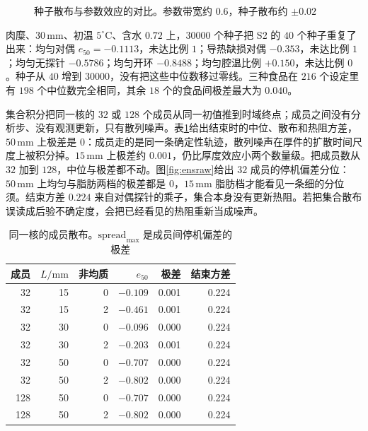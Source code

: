 \begin{figure}[htbp]
\centering
{}
\caption{种子散布与参数效应的对比。参数带宽约 \(0.6\)，种子散布约 \(\pm0.02\)}
\label{fig:rseed}
\end{figure}

肉糜、\(30\,\mathrm{mm}\)、初温 \(5^\circ\mathrm{C}\)、含水 \(0.72\) 上，\(30000\) 个种子把 S2 的 \(40\) 个种子重复了出来：均匀对偶 \(e_{50}=-0.1113\)，未达比例 \(1\)；导热缺损对偶 \(-0.353\)，未达比例 \(1\)；均匀无探针 \(-0.5786\)；均匀开环 \(-0.8488\)；均匀腔温比例 \(+0.150\)，未达比例 \(0\)。种子从 \(40\) 增到 \(30000\)，没有把这些中位数移过零线。三种食品在 \(216\) 个设定里有 \(198\) 个中位数完全相同，其余 \(18\) 个的食品间极差最大为 \(0.040\)。

集合积分把同一核的 \(32\) 或 \(128\) 个成员从同一初值推到时域终点；成员之间没有分析步、没有观测更新，只有散列噪声。表\ref{tab:ens}{}给出结束时的中位、散布和热阻方差，\(50\,\mathrm{mm}\) 上极差是 \(0\)：成员走的是同一条确定性轨迹，散列噪声在厚件的扩散时间尺度上被积分掉。\(15\,\mathrm{mm}\) 上极差约 \(0.001\)，仍比厚度效应小两个数量级。把成员数从 \(32\) 加到 \(128\)，中位与极差都不动。图\ref{fig:ensraw}{}给出 \(32\) 成员的停机偏差分位：\(50\,\mathrm{mm}\) 上均匀与脂肪两档的极差都是 \(0\)，\(15\,\mathrm{mm}\) 脂肪档才能看见一条细的分位须。结束方差 \(0.224\) 来自对偶探针的乘子，集合本身没有更新热阻。若把集合散布误读成后验不确定度，会把已经看见的热阻重新当成噪声。

\begin{table}[htbp]
\centering
\caption{同一核的成员散布。\(\mathrm{spread}_{\max}\) 是成员间停机偏差的极差}
\label{tab:ens}
\setlength{\tabcolsep}{2.4pt}
{\footnotesize
\begin{tabular}{rrrrrr}
\toprule
成员 & \(L/\mathrm{mm}\) & 非均质 & \(e_{50}\) & 极差 & 结束方差 \\
\midrule
32 & 15 & 0 & \(-0.109\) & 0.001 & 0.224 \\
32 & 15 & 2 & \(-0.461\) & 0.001 & 0.224 \\
32 & 30 & 0 & \(-0.096\) & 0.000 & 0.224 \\
32 & 30 & 2 & \(-0.203\) & 0.001 & 0.224 \\
32 & 50 & 0 & \(-0.707\) & 0.000 & 0.224 \\
32 & 50 & 2 & \(-0.802\) & 0.000 & 0.224 \\
128 & 50 & 0 & \(-0.707\) & 0.000 & 0.224 \\
128 & 50 & 2 & \(-0.802\) & 0.000 & 0.224 \\
\bottomrule
\end{tabular}}
\end{table}

